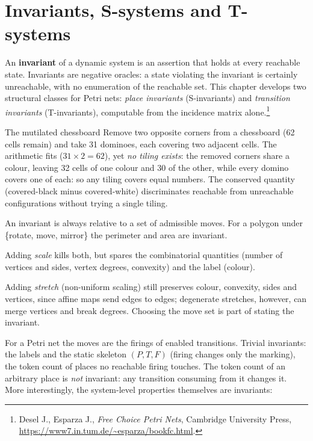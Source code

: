 \section{Invariants, S-systems and T-systems}

An \textbf{invariant} of a dynamic system is an assertion that holds at every reachable state. Invariants are negative oracles: a state violating the invariant is certainly unreachable, with no enumeration of the reachable set. This chapter develops two structural classes for Petri nets: \emph{place invariants} (S-invariants) and \emph{transition invariants} (T-invariants), computable from the incidence matrix alone.\footnote{Desel J., Esparza J., \emph{Free Choice Petri Nets}, Cambridge University Press, \url{https://www7.in.tum.de/~esparza/bookfc.html}.}

\begin{examplebox}{The mutilated chessboard}
Remove two opposite corners from a chessboard (62 cells remain) and take 31 dominoes, each covering two adjacent cells. The arithmetic fits ($31 \times 2 = 62$), yet \emph{no tiling exists}: the removed corners share a colour, leaving 32 cells of one colour and 30 of the other, while every domino covers one of each: so any tiling covers equal numbers. The conserved quantity (covered-black minus covered-white) discriminates reachable from unreachable configurations without trying a single tiling.
\end{examplebox}

An invariant is always relative to a set of admissible moves. For a polygon under \{rotate, move, mirror\} the perimeter and area are invariant.

Adding \emph{scale} kills both, but spares the combinatorial quantities (number of vertices and sides, vertex degrees, convexity) and the label (colour).

Adding \emph{stretch} (non-uniform scaling) still preserves colour, convexity, sides and vertices, since affine maps send edges to edges; degenerate stretches, however, can merge vertices and break degrees. Choosing the move set is part of stating the invariant.

For a Petri net the moves are the firings of enabled transitions. Trivial invariants: the labels and the static skeleton $(P, T, F)$ (firing changes only the marking), the token count of places no reachable firing touches. The token count of an arbitrary place is \emph{not} invariant: any transition consuming from it changes it. More interestingly, the system-level properties themselves are invariants:


